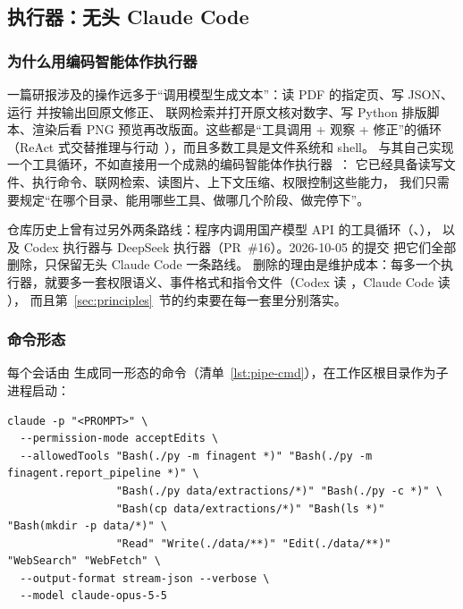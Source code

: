 \subsection{执行器：无头 Claude Code}
\label{sec:pipe-harness}

\subsubsection{为什么用编码智能体作执行器}

一篇研报涉及的操作远多于“调用模型生成文本”：读 PDF 的指定页、写 JSON、运行  并按输出回原文修正、
联网检索并打开原文核对数字、写 Python 排版脚本、渲染后看 PNG 预览再改版面。这些都是“工具调用 + 观察 + 修正”的循环
（ReAct 式交替推理与行动~\citep{yao2023react}），而且多数工具是文件系统和 shell。
与其自己实现一个工具循环，不如直接用一个成熟的编码智能体作执行器~\citep{anthropic2025claudecode,yang2024sweagent}：
它已经具备读写文件、执行命令、联网检索、读图片、上下文压缩、权限控制这些能力，
我们只需要规定“在哪个目录、能用哪些工具、做哪几个阶段、做完停下”。

仓库历史上曾有过另外两条路线：程序内调用国产模型 API 的工具循环（、），
以及 Codex 执行器与 DeepSeek 执行器（PR~\#16）。2026-10-05 的提交  把它们全部删除，只保留无头 Claude Code 一条路线。
删除的理由是维护成本：每多一个执行器，就要多一套权限语义、事件格式和指令文件（Codex 读 ，Claude Code 读 ），
而且第~\ref{sec:principles}~节的约束要在每一套里分别落实。

\subsubsection{命令形态}

每个会话由  生成同一形态的命令（清单~\ref{lst:pipe-cmd}），在工作区根目录作为子进程启动：

\begin{lstlisting}[caption={一个会话的命令行（\code{agent\_command}；\texttt{<PROMPT>} 为角色启动提示）},label={lst:pipe-cmd}]
claude -p "<PROMPT>" \
  --permission-mode acceptEdits \
  --allowedTools "Bash(./py -m finagent *)" "Bash(./py -m finagent.report_pipeline *)" \
                 "Bash(./py data/extractions/*)" "Bash(./py -c *)" \
                 "Bash(cp data/extractions/*)" "Bash(ls *)" "Bash(mkdir -p data/*)" \
                 "Read" "Write(./data/**)" "Edit(./data/**)" "WebSearch" "WebFetch" \
  --output-format stream-json --verbose \
  --model claude-opus-5-5
\end{lstlisting}

